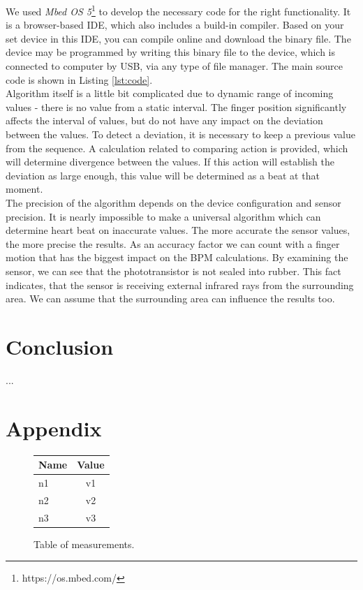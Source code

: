 \documentclass[11pt,a4paper]{article}
\begin{document}
We used \textit{Mbed OS 5}\footnote{https://os.mbed.com/} to develop the necessary code for the right functionality. It is a browser-based IDE, which also includes a build-in compiler. Based on your set device in this IDE, you can compile online and download the binary file. The device may be programmed by writing this binary file to the device, which is connected to computer by USB, via any type of file manager. The main source code is shown in Listing \ref{lst:code}.\\

Algorithm itself is a little bit complicated due to dynamic range of incoming values - there is no value from a static interval. The finger position significantly affects the interval of values, but do not have any impact on the deviation between the values. To detect a deviation, it is necessary to keep a previous value from the sequence. A calculation related to comparing action is provided, which will determine divergence between the values. If this action will establish the deviation as large enough, this value will be determined as a beat at that moment.\\

The precision of the algorithm depends on the device configuration and sensor precision. It is nearly impossible to make a universal algorithm which can determine heart beat on inaccurate values. The more accurate the sensor values, the more precise the results. As an accuracy factor we can count with a finger motion that has the biggest impact on the BPM calculations. By examining the sensor, we can see that the phototransistor is not sealed into rubber. This fact indicates, that the sensor is receiving external infrared rays from the surrounding area. We can assume that the surrounding area can influence the results too.

\section{Conclusion}
...

\newpage %

\section{Appendix}

\begin{figure}[H]
    \begin{center}
        \begin{tabular}{|l|c|}
            \hline
            \textbf{Name} & \textbf{Value} \\
            \hline\hline
            n1 & v1 \\\hline
            n2 & v2 \\\hline
            n3 & v3 \\\hline
        \end{tabular}
    \end{center}
    \caption{Table of measurements.}
    \label{fig:measurements}
\end{figure}
\end{document}
